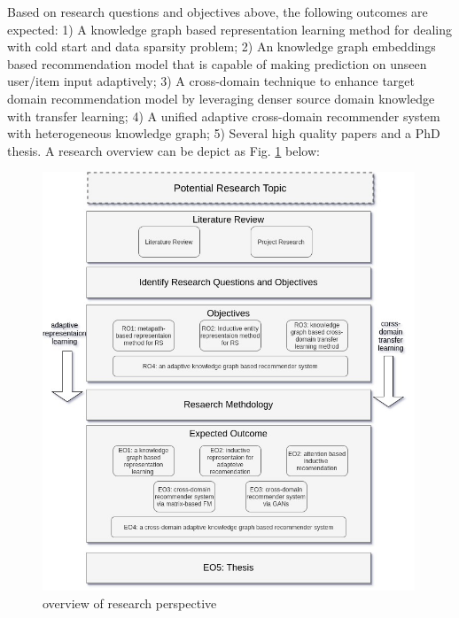 Based on research questions and objectives above, the following outcomes are expected:
1) A knowledge graph based representation learning method for dealing with cold start and data sparsity problem;
2) An knowledge graph embeddings based recommendation model that is capable of making prediction on unseen user/item input adaptively;
3) A cross-domain technique to enhance target domain recommendation model by leveraging denser source domain knowledge with transfer learning;
4) A unified adaptive cross-domain recommender system with heterogeneous knowledge graph;
5) Several high quality papers and a PhD thesis. A research overview can be depict as Fig. \ref{fig:r_overview} below: 
\begin{figure}[!h]
    \centering
    \includegraphics[width=0.99\textwidth]{figs/research_overview.jpg}
    \caption{overview of research perspective}\label{fig:r_overview}
\end{figure}
